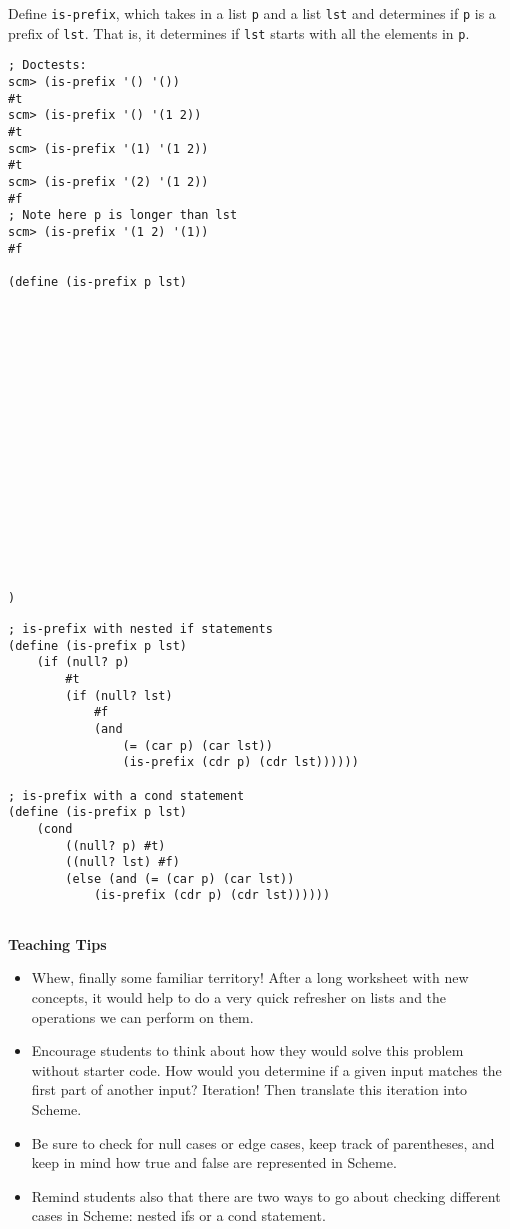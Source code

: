 \begin{blocksection}
\question Define \lstinline$is-prefix$, which takes in a list \lstinline$p$ and a list \lstinline$lst$ and determines 
if \lstinline$p$ is a prefix of \lstinline$lst$.
That is, it determines if \lstinline$lst$ starts with all the elements in \lstinline$p$.

\begin{lstlisting}
; Doctests:
scm> (is-prefix '() '())
#t
scm> (is-prefix '() '(1 2))
#t
scm> (is-prefix '(1) '(1 2))
#t
scm> (is-prefix '(2) '(1 2))
#f
; Note here p is longer than lst
scm> (is-prefix '(1 2) '(1))
#f

(define (is-prefix p lst)


















)
\end{lstlisting}
\end{blocksection}

\begin{blocksection}
\begin{solution}[.25in]
\begin{lstlisting}
; is-prefix with nested if statements
(define (is-prefix p lst)
    (if (null? p)
        #t
        (if (null? lst)
            #f
            (and
                (= (car p) (car lst))
                (is-prefix (cdr p) (cdr lst))))))

; is-prefix with a cond statement
(define (is-prefix p lst)
    (cond 
        ((null? p) #t)
        ((null? lst) #f)
        (else (and (= (car p) (car lst))
            (is-prefix (cdr p) (cdr lst))))))
 
\end{lstlisting}
\end{solution}
\end{blocksection}

\begin{blocksection}
\begin{guide}
\textbf{Teaching Tips}
\begin{itemize}
	\item Whew, finally some familiar territory! After a long worksheet with new concepts, it would help to do a very quick refresher on lists and the operations we can perform on them.
	\item Encourage students to think about how they would solve this problem without starter code. How would you determine if a given input matches the first part of another input? Iteration! Then translate this iteration into Scheme.
	\item Be sure to check for null cases or edge cases, keep track of parentheses, and keep in mind how true and false are represented in Scheme.
	\item Remind students also that there are two ways to go about checking different cases in Scheme: nested ifs or a cond statement.
\end{itemize}
\end{guide}
\end{blocksection}
